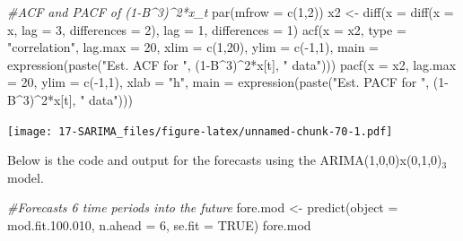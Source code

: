 \documentclass[
]{book}
\newenvironment{Shaded}{\begin{snugshade}}{\end{snugshade}}
\newcommand{\AttributeTok}[1]{\textcolor[rgb]{0.77,0.63,0.00}{#1}}
\newcommand{\CommentTok}[1]{\textcolor[rgb]{0.56,0.35,0.01}{\textit{#1}}}
\newcommand{\ConstantTok}[1]{\textcolor[rgb]{0.00,0.00,0.00}{#1}}
\newcommand{\DecValTok}[1]{\textcolor[rgb]{0.00,0.00,0.81}{#1}}
\newcommand{\FloatTok}[1]{\textcolor[rgb]{0.00,0.00,0.81}{#1}}
\newcommand{\FunctionTok}[1]{\textcolor[rgb]{0.00,0.00,0.00}{#1}}
\newcommand{\NormalTok}[1]{#1}
\newcommand{\OtherTok}[1]{\textcolor[rgb]{0.56,0.35,0.01}{#1}}
\newcommand{\SpecialCharTok}[1]{\textcolor[rgb]{0.00,0.00,0.00}{#1}}
\newcommand{\StringTok}[1]{\textcolor[rgb]{0.31,0.60,0.02}{#1}}
\theoremstyle{definition}
\theoremstyle{definition}
\theoremstyle{definition}
\theoremstyle{definition}
\theoremstyle{remark}
\begin{document}
\begin{Shaded}
\begin{Highlighting}[]
 \CommentTok{\#ACF and PACF of (1{-}B\^{}3)\^{}2*x\_t}
  \FunctionTok{par}\NormalTok{(}\AttributeTok{mfrow =} \FunctionTok{c}\NormalTok{(}\DecValTok{1}\NormalTok{,}\DecValTok{2}\NormalTok{))}
\NormalTok{  x2 }\OtherTok{\textless{}{-}} \FunctionTok{diff}\NormalTok{(}\AttributeTok{x =} \FunctionTok{diff}\NormalTok{(}\AttributeTok{x =}\NormalTok{ x, }\AttributeTok{lag =} \DecValTok{3}\NormalTok{, }\AttributeTok{differences =} \DecValTok{2}\NormalTok{), }\AttributeTok{lag =} \DecValTok{1}\NormalTok{, }\AttributeTok{differences =} \DecValTok{1}\NormalTok{)}
  \FunctionTok{acf}\NormalTok{(}\AttributeTok{x =}\NormalTok{ x2, }\AttributeTok{type =} \StringTok{"correlation"}\NormalTok{, }\AttributeTok{lag.max =} \DecValTok{20}\NormalTok{, }\AttributeTok{xlim =} \FunctionTok{c}\NormalTok{(}\DecValTok{1}\NormalTok{,}\DecValTok{20}\NormalTok{),}
      \AttributeTok{ylim =} \FunctionTok{c}\NormalTok{(}\SpecialCharTok{{-}}\DecValTok{1}\NormalTok{,}\DecValTok{1}\NormalTok{), }\AttributeTok{main =} \FunctionTok{expression}\NormalTok{(}\FunctionTok{paste}\NormalTok{(}\StringTok{"Est. ACF for "}\NormalTok{, (}\DecValTok{1}\SpecialCharTok{{-}}\NormalTok{B}\SpecialCharTok{\^{}}\DecValTok{3}\NormalTok{)}\SpecialCharTok{\^{}}\DecValTok{2}\SpecialCharTok{*}\NormalTok{x[t], }\StringTok{" data"}\NormalTok{)))}
  \FunctionTok{pacf}\NormalTok{(}\AttributeTok{x =}\NormalTok{ x2, }\AttributeTok{lag.max =} \DecValTok{20}\NormalTok{, }\AttributeTok{ylim =} \FunctionTok{c}\NormalTok{(}\SpecialCharTok{{-}}\DecValTok{1}\NormalTok{,}\DecValTok{1}\NormalTok{), }\AttributeTok{xlab =} \StringTok{"h"}\NormalTok{, }
       \AttributeTok{main =} \FunctionTok{expression}\NormalTok{(}\FunctionTok{paste}\NormalTok{(}\StringTok{"Est. PACF for "}\NormalTok{, (}\DecValTok{1}\SpecialCharTok{{-}}\NormalTok{B}\SpecialCharTok{\^{}}\DecValTok{3}\NormalTok{)}\SpecialCharTok{\^{}}\DecValTok{2}\SpecialCharTok{*}\NormalTok{x[t], }\StringTok{" data"}\NormalTok{)))}
\end{Highlighting}
\end{Shaded}

\texttt{[image: 17-SARIMA\_files/figure-latex/unnamed-chunk-70-1.pdf]}

Below is the code and output for the forecasts using the ARIMA(1,0,0)x(0,1,0)\(_3\) model.

\begin{Shaded}
\begin{Highlighting}[]
\CommentTok{\#Forecasts 6 time periods into the future}
\NormalTok{fore.mod }\OtherTok{\textless{}{-}} \FunctionTok{predict}\NormalTok{(}\AttributeTok{object =}\NormalTok{ mod.fit.}\FloatTok{100.010}\NormalTok{, }\AttributeTok{n.ahead =} 
    \DecValTok{6}\NormalTok{, }\AttributeTok{se.fit =} \ConstantTok{TRUE}\NormalTok{) }
\NormalTok{fore.mod}
\end{Highlighting}
\end{Shaded}
\end{document}
